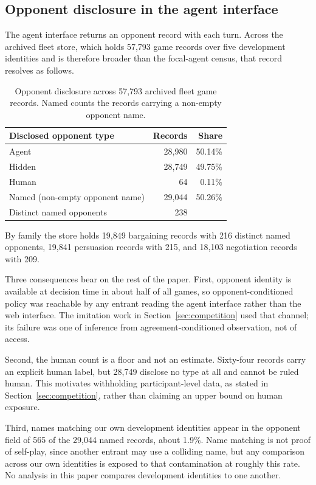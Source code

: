 \subsection{Opponent disclosure in the agent interface}

The agent interface returns an opponent record with each turn. Across the
archived fleet store, which holds 57,793 game records over five development
identities and is therefore broader than the focal-agent census, that record
resolves as follows.

\begin{table}[H]
\centering
\scriptsize
\caption{Opponent disclosure across 57,793 archived fleet game records. Named
counts the records carrying a non-empty opponent name.}
\label{tab:disclosure}
\setlength{\tabcolsep}{6pt}
\renewcommand{\arraystretch}{0.92}
\begin{tabular}{@{}lrr@{}}
\toprule
Disclosed opponent type & Records & Share \\
\midrule
Agent & 28,980 & 50.14\% \\
Hidden & 28,749 & 49.75\% \\
Human & 64 & 0.11\% \\
\midrule
Named (non-empty opponent name) & 29,044 & 50.26\% \\
Distinct named opponents & 238 & \\
\bottomrule
\end{tabular}
\end{table}

By family the store holds 19,849 bargaining records with 216 distinct named
opponents, 19,841 persuasion records with 215, and 18,103 negotiation records
with 209.

Three consequences bear on the rest of the paper. First, opponent identity is
available at decision time in about half of all games, so opponent-conditioned
policy was reachable by any entrant reading the agent interface rather than the
web interface. The imitation work in Section~\ref{sec:competition} used that
channel; its failure was one of inference from agreement-conditioned
observation, not of access.

Second, the human count is a floor and not an estimate. Sixty-four records
carry an explicit human label, but 28,749 disclose no type at all and cannot be
ruled human. This motivates withholding participant-level data, as stated in
Section~\ref{sec:competition}, rather than claiming an upper bound on human
exposure.

Third, names matching our own development identities appear in the opponent
field of 565 of the 29,044 named records, about 1.9\%. Name matching is not
proof of self-play, since another entrant may use a colliding name, but any
comparison across our own identities is exposed to that contamination at
roughly this rate. No analysis in this paper compares development identities to
one another.
